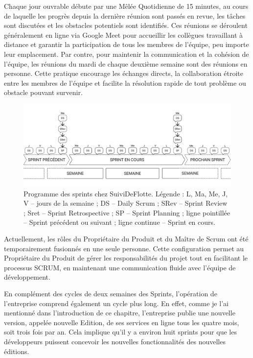 Chaque jour ouvrable débute par une Mêlée Quotidienne de 15 minutes, au cours de laquelle les progrès depuis la dernière réunion sont passés en revue, les tâches sont discutées et les obstacles potentiels sont identifiés. Ces réunions se déroulent généralement en ligne via Google Meet pour accueillir les collègues travaillant à distance et garantir la participation de tous les membres de l'équipe, peu importe leur emplacement. Par contre, pour maintenir la communication et la cohésion de l'équipe, les réunions du mardi de chaque deuxième semaine sont des réunions en personne. Cette pratique encourage les échanges directs, la collaboration étroite entre les membres de l'équipe et facilite la résolution rapide de tout problème ou obstacle pouvant survenir.

\begin{figure}[ht]
    \centering
    \includegraphics[width=\textwidth]{img/sprint04}
    \caption{Programme des sprints chez SuiviDeFlotte. Légende : L, Ma, Me, J, V -- jours de la semaine ; DS -- Daily Scrum ; SRev -- Sprint Review ; Sret -- Sprint Retrospective ; SP -- Sprint Planning ; ligne pointillée -- Sprint précédent ou suivant ; ligne continue -- Sprint en cours.}
    \label{fig:sprint}
\end{figure}

Actuellement, les rôles du Propriétaire du Produit et du Maître de Scrum ont été temporairement fusionnés en une seule personne. Cette configuration permet au Propriétaire du Produit de gérer les responsabilités du projet tout en facilitant le processus SCRUM, en maintenant une communication fluide avec l'équipe de développement.

En complément des cycles de deux semaines des Sprints, l'opération de l'entreprise comprend également un cycle plus long. En effet, comme je l'ai mentionné dans l'introduction de ce chapitre, l'entreprise publie une nouvelle version, appelée nouvelle Edition, de ses services en ligne tous les quatre mois, soit trois fois par an. Cela implique qu'il y a environ huit sprints pour que les développeurs puissent concevoir les nouvelles fonctionnalités des nouvelles éditions.

